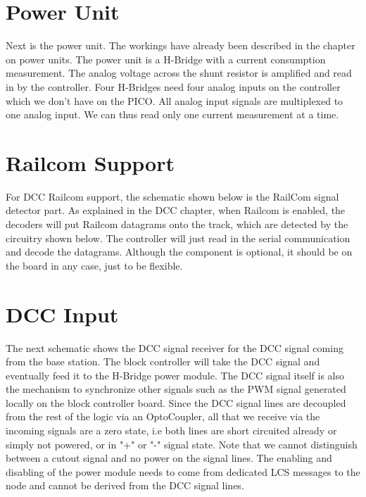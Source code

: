 \section{Power Unit}

Next is the power unit. The workings have already been described in the chapter on power units. The power unit is a H-Bridge with a current consumption measurement. The analog voltage across the shunt resistor is amplified and read in by the controller. Four H-Bridges need four analog inputs on the controller which we don't have on the PICO. All analog input signals are multiplexed to one analog input. We can thus read only one current measurement at a time.


\section{Railcom Support}

For DCC Railcom support, the schematic shown below is the RailCom signal detector part. As explained in the DCC chapter, when Railcom is enabled, the decoders will put Railcom datagrams onto the track, which are detected by the circuitry shown below. The controller will just read in the serial communication and decode the datagrams. Although the component is optional, it should be on the board in any case, just to be flexible.


\section{DCC Input}

The next schematic shows the DCC signal receiver for the DCC signal coming from the base station. The block controller will take the DCC signal and eventually feed it to the H-Bridge power module. The DCC signal itself is also the mechanism to synchronize other signals such as the PWM signal generated locally on the block controller board. Since the DCC signal lines are decoupled from the rest of the logic via an OptoCoupler, all that we receive via the incoming signals are a zero state, i.e both lines are short circuited already or simply not powered, or in "+" or "-" signal state. Note that we cannot distinguish between a cutout signal and no power on the signal lines. The enabling and disabling of the power module needs to come from dedicated LCS messages to the node and cannot be derived from the DCC signal lines.

